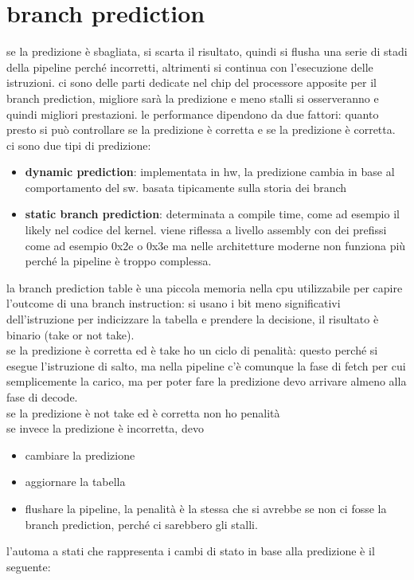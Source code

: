 \documentclass[12pt, oneside]{extbook} %
\begin{document}
\section{branch prediction}
se la predizione è sbagliata, si scarta il risultato, quindi si flusha una serie di stadi della pipeline perché incorretti, altrimenti si continua con l'esecuzione delle istruzioni. ci sono delle parti dedicate nel chip del processore apposite per il branch prediction, migliore sarà la predizione e meno stalli si osserveranno e quindi migliori prestazioni. le performance dipendono da due fattori: quanto presto si può controllare se la predizione è corretta e se la predizione è corretta.\\ ci sono due tipi di predizione:
\begin{itemize}
\item \textbf{dynamic prediction}: implementata in hw, la predizione cambia in base al comportamento del sw. basata tipicamente sulla storia dei branch
\item \textbf{static branch prediction}: determinata a compile time, come ad esempio il \textsf{likely} nel codice del kernel. viene riflessa a livello assembly con dei prefissi come ad esempio \textsf{0x2e} o \textsf{0x3e} ma nelle architetture moderne non funziona più perché la pipeline è troppo complessa.
\end{itemize}
la branch prediction table è una piccola memoria nella cpu utilizzabile per capire l'outcome di una branch instruction: si usano i bit meno significativi dell'istruzione per indicizzare la tabella e prendere la decisione, il risultato è binario (take or not take). \\ se la predizione è corretta ed è take ho un ciclo di penalità: questo perché si esegue l'istruzione di salto, ma nella pipeline c'è comunque la fase di fetch per cui semplicemente la carico, ma per poter fare la predizione devo arrivare almeno alla fase di decode.\\ se la predizione è not take ed è corretta non ho penalità\\ se invece la predizione è incorretta, devo 
\begin{itemize}
\item cambiare la predizione
\item aggiornare la tabella
\item flushare la pipeline, la penalità è la stessa che si avrebbe se non ci fosse la branch prediction, perché ci sarebbero gli stalli.
\end{itemize}
l'automa a stati che rappresenta i cambi di stato in base alla predizione è il seguente:\\
\end{document}
